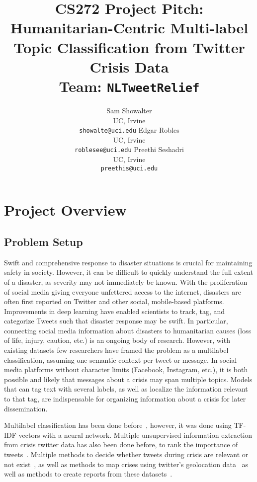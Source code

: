 \documentclass[11pt,a4paper]{article}
\title{CS272 Project Pitch: Humanitarian-Centric Multi-label Topic Classification from Twitter Crisis Data\\
Team: \texttt{NLTweetRelief}}
\author{Sam Showalter \\
  UC, Irvine \\  
\texttt{showalte@uci.edu} \And
Edgar Robles \\
  UC, Irvine \\  
\texttt{roblesee@uci.edu}\And
Preethi Seshadri \\
  UC, Irvine \\  
\texttt{preethis@uci.edu}}
\date{}
\begin{document}
\maketitle


\section{Project Overview}

\subsection{Problem Setup}

Swift and comprehensive response to disaster situations is crucial for maintaining safety in society. However, it can be difficult to quickly understand the full extent of a disaster, as severity may not immediately be known. With the proliferation of social media giving everyone unfettered access to the internet, disasters are often first reported on Twitter and other social, mobile-based platforms. Improvements in deep learning have enabled scientists to track, tag, and categorize Tweets such that disaster response may be swift. In particular, connecting social media information about disasters to humanitarian causes (loss of life, injury, caution, etc.) is an ongoing body of research. However, with existing datasets few researchers have framed the problem as a multilabel classification, assuming one semantic context per tweet or message. In social media platforms without character limits (Facebook, Instagram, etc.), it is both possible and likely that messages about a crisis may span multiple topics. Models that can tag text with several labels, as well as localize the information relevant to that tag, are indispensable for organizing information about a crisis for later dissemination.

Multilabel classification has been done before~\cite{schulz2014}, however, it was done using TF-IDF vectors with a neural network. Multiple unsupervised information extraction from crisis twitter data has also been done before, to rank the importance of tweets~\cite{interdonato2018}. Multiple methods to decide whether tweets during crisis are relevant or not exist~\cite{kruspe2020}, as well as methods to map crises using twitter's geolocation data~\cite{middleton2014} as well as methods to create reports from these datasets~\cite{corso2017}.
\end{document}
